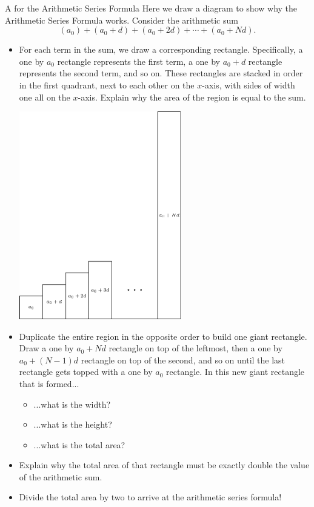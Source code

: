 \begin{exercise}{A  for the Arithmetic Series Formula \Coffeecup \Coffeecup \Coffeecup}
Here we draw a diagram to show why the Arithmetic Series Formula works.  
Consider the arithmetic sum $$\left(a_0\right)+\left(a_0+d\right)+\left(a_0+2d\right)+\cdots+\left(a_0+Nd\right).$$
\begin{itemize}

\item For each term in the sum, we draw a corresponding rectangle.  Specifically, a one by $a_0$ rectangle represents the first term, a one by $a_0+d$ rectangle represents the second term, and so on.  These rectangles are stacked in order in the first quadrant, next to each other on the $x$-axis, with sides of width one all on the $x$-axis.  Explain why the area of the region is equal to the sum. \vspace*{1in}

	\begin{center}
		\includegraphics[width=200pt]{ChapterSeqSer/Figures/arithmetic.eps}
	\end{center}

\item Duplicate the entire region in the opposite order to build one giant rectangle.  Draw a one by $a_0 +Nd$ rectangle on top of the leftmost, then a one by $a_0+(N-1)d$ rectangle on top of the second, and so on until the last rectangle gets topped with a one by $a_0$ rectangle.  In this new giant rectangle that is formed...

\begin{itemize}
\item  ...what is the width?
\item ...what is the height?
\item ...what is the total area?
\end{itemize}

\item Explain why the total area of that rectangle must be exactly double the value of the arithmetic sum.  
\vspace*{.5in}
\item Divide the total area by two to arrive at the arithmetic series formula!
\vspace*{.5in}
\end{itemize}
\end{exercise}

